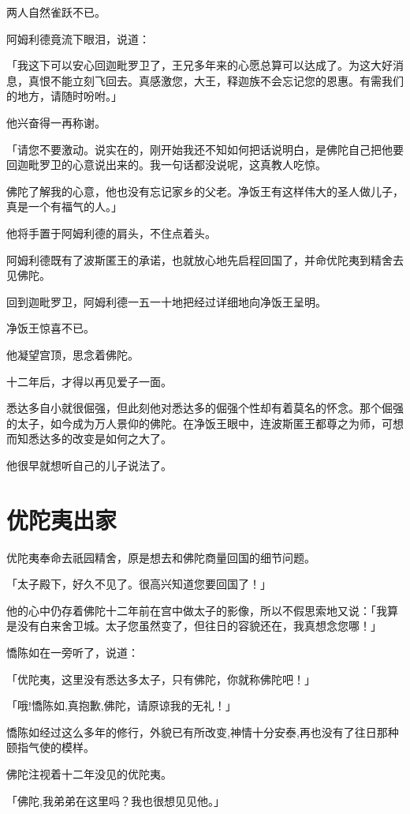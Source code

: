 \documentclass[twoside,openany]{book}
\begin{document}
两人自然雀跃不已。

阿姆利德竟流下眼泪，说道：

「我这下可以安心回迦毗罗卫了，王兄多年来的心愿总算可以达成了。为这大好消息，真恨不能立刻飞回去。真感激您，大王，释迦族不会忘记您的恩惠。有需我们的地方，请随时吩咐。」

他兴奋得一再称谢。

「请您不要激动。说实在的，刚开始我还不知如何把话说明白，是佛陀自己把他要回迦毗罗卫的心意说出来的。我一句话都没说呢，这真教人吃惊。

佛陀了解我的心意，他也没有忘记家乡的父老。净饭王有这样伟大的圣人做儿子，真是一个有福气的人。」

他将手置于阿姆利德的肩头，不住点着头。

阿姆利德既有了波斯匿王的承诺，也就放心地先启程回国了，并命优陀夷到精舍去见佛陀。

回到迦毗罗卫，阿姆利德一五一十地把经过详细地向净饭王呈明。

净饭王惊喜不已。

他凝望宫顶，思念着佛陀。

十二年后，才得以再见爱子一面。

悉达多自小就很倔强，但此刻他对悉达多的倔强个性却有着莫名的怀念。那个倔强的太子，如今成为万人景仰的佛陀。在净饭王眼中，连波斯匿王都尊之为师，可想而知悉达多的改变是如何之大了。

他很早就想听自己的儿子说法了。

\section{优陀夷出家}\label{sec7.4}

优陀夷奉命去祇园精舍，原是想去和佛陀商量回国的细节问题。

「太子殿下，好久不见了。很高兴知道您要回国了！」

他的心中仍存着佛陀十二年前在宫中做太子的影像，所以不假思索地又说：「我算是没有白来舍卫城。太子您虽然变了，但往日的容貌还在，我真想念您哪！」

憍陈如在一旁听了，说道：

「优陀夷，这里没有悉达多太子，只有佛陀，你就称佛陀吧！」

「哦!憍陈如,真抱歉,佛陀，请原谅我的无礼！」

憍陈如经过这么多年的修行，外貌已有所改变,神情十分安泰,再也没有了往日那种颐指气使的模样。

佛陀注视着十二年没见的优陀夷。

「佛陀,我弟弟在这里吗？我也很想见见他。」
\end{document}
